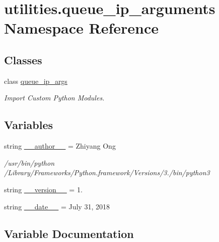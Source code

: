 \hypertarget{namespaceutilities_1_1queue__ip__arguments}{}\section{utilities.\+queue\+\_\+ip\+\_\+arguments Namespace Reference}
\label{namespaceutilities_1_1queue__ip__arguments}
\subsection*{Classes}
\begin{DoxyCompactItemize}
\item 
class \hyperlink{classutilities_1_1queue__ip__arguments_1_1queue__ip__args}{queue\+\_\+ip\+\_\+args}
\begin{DoxyCompactList}\small\item\em Import Custom Python Modules. \end{DoxyCompactList}\end{DoxyCompactItemize}
\subsection*{Variables}
\begin{DoxyCompactItemize}
\item 
string \hyperlink{namespaceutilities_1_1queue__ip__arguments_adc999d785e9803ef585833d4c1ae53e4}{\+\_\+\+\_\+author\+\_\+\+\_\+} = \textquotesingle{}Zhiyang Ong\textquotesingle{}
\begin{DoxyCompactList}\small\item\em /usr/bin/python /\+Library/\+Frameworks/\+Python.framework/\+Versions/3./bin/python3 \end{DoxyCompactList}\item 
string \hyperlink{namespaceutilities_1_1queue__ip__arguments_aac0867ebe34eaed5fb081f33e4ac9740}{\+\_\+\+\_\+version\+\_\+\+\_\+} = \textquotesingle{}1.\textquotesingle{}
\item 
string \hyperlink{namespaceutilities_1_1queue__ip__arguments_a43f24226d75dbc13271de84f469f6944}{\+\_\+\+\_\+date\+\_\+\+\_\+} = \textquotesingle{}July 31, 2018\textquotesingle{}
\end{DoxyCompactItemize}


\subsection{Variable Documentation}
\hypertarget{namespaceutilities_1_1queue__ip__arguments_adc999d785e9803ef585833d4c1ae53e4}{}
